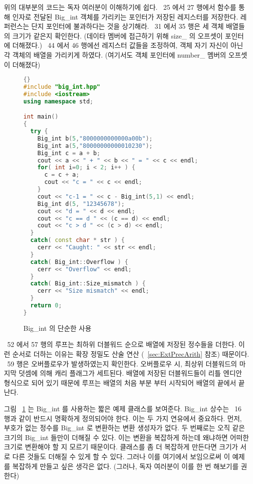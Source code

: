 위의 대부분의 코드는 독자 여러분이 이해하기에 쉽다. ~25 에서 27 행에서
함수를 통해 인자로 전달된 {\code Big\_int} 객체를 가리키는 포인터가 저장된 레지스터를  
저장한다. 레퍼런스는 단지 포인터에 불과하다는 것을 상기해라. ~31 에서 35 행은 세 객체
배열들의 크기가 같은지 확인한다. (데이타 멤버에 접근하기 위해 {\code size\_} 의 오프셋이 
포인터에 더해졌다.) ~44 에서 46 행에선 레지스터 값들을 조정하여, 
객체 자기 자신이 아닌 각 객체의 배열을 가리키게 하였다.
(여기서도 객체 포인터에 {\code number\_} 멤버의 오프셋이 더해졌다) 

\begin{figure}[tp]
\begin{lstlisting}[language=C++, frame=tlrb]{}
#include "big_int.hpp"
#include <iostream>
using namespace std;

int main()
{
  try {
    Big_int b(5,"8000000000000a00b");
    Big_int a(5,"80000000000010230");
    Big_int c = a + b;
    cout << a << " + " << b << " = " << c << endl;
    for( int i=0; i < 2; i++ ) {
      c = c + a;
      cout << "c = " << c << endl;
    }
    cout << "c-1 = " << c - Big_int(5,1) << endl;
    Big_int d(5, "12345678");
    cout << "d = " << d << endl;
    cout << "c == d " << (c == d) << endl;
    cout << "c > d " << (c > d) << endl;
  }
  catch( const char * str ) {
    cerr << "Caught: " << str << endl;
  }
  catch( Big_int::Overflow ) {
    cerr << "Overflow" << endl;
  }
  catch( Big_int::Size_mismatch ) {
    cerr << "Size mismatch" << endl;
  }
  return 0;
}
\end{lstlisting}
\caption{{\code Big\_int} 의 단순한 사용 \label{fig:BigIntEx}}
\end{figure}

~52 에서 57 행의 루프는 최하위 더블워드 순으로 배열에 저장된 정수들을 더한다.
이런 순서로 더하는 이유는 확장 정밀도 산술 연산 (~\ref{sec:ExtPrecArith} 참조) 때문이다.
~59 행은 오버플로우가 발생하였는지 확인한다. 오버플로우 시, 최상위 더블워드의
마지막 덧셈에 의해 캐리 플래그가 세트된다. 배열에 저장된 더블워드들이 리틀 엔디안 형식으로
되어 있기 때문에 루프는 배열의 처음 부분 부터 시작되어 배열의 끝에서 끝난다. 

그림 ~\ref{fig:BigIntEx} 는 {\code Big\_int} 를 사용하는 짧은 예제 클래스를 보여준다.
{\code Big\_int} 상수는 ~16 행과 같이 반드시 명확하게 정의되어야 한다. 이는 두 가지 연유에서 중요하다. 
먼저, 부호가 없는 정수를 {\code Big\_int} 로 변환하는 변환 생성자가 없다. 두 번째로는 
오직 같은 크기의 {\code Big\_int} 들만이 더해질 수 있다. 이는 변환을 복잡하게 하는데 왜냐하면
어떠한 크기로 변환해야 할 지 모르기 때문이다. 클래스를 좀 더 복잡하게 만든다면 크기가 서로 다른
것들도 더해질 수 있게 할 수 있다. 그러나 이를 여기에서 보임으로써 이 예제를 복잡하게
만들고 싶은 생각은 없다. (그러나, 독자 여러분이 이를 한 번 해보기를 권한다) 

